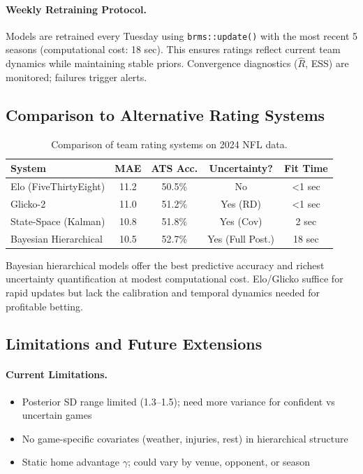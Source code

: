 \paragraph{Weekly Retraining Protocol.}
Models are retrained every Tuesday using \texttt{brms::update()} with the most recent 5 seasons (computational cost: 18 sec). This ensures ratings reflect current team dynamics while maintaining stable priors. Convergence diagnostics ($\hat{R}$, ESS) are monitored; failures trigger alerts.

\subsection{Comparison to Alternative Rating Systems}

\begin{table}[!ht]
\centering
\caption[Rating system comparison]{Comparison of team rating systems on 2024 NFL data.}
\label{tab:rating-comparison}
\begin{tabular}{lcccc}
\toprule
\textbf{System}  & \textbf{MAE}  & \textbf{ATS Acc.}  & \textbf{Uncertainty?}  & \textbf{Fit Time} \\
\midrule
Elo (FiveThirtyEight) & 11.2 & 50.5\% & No & <1 sec \\
Glicko-2 & 11.0 & 51.2\% & Yes (RD) & <1 sec \\
State-Space (Kalman) & 10.8 & 51.8\% & Yes (Cov) & 2 sec \\
Bayesian Hierarchical & 10.5 & 52.7\% & Yes (Full Post.) & 18 sec \\
\bottomrule
\end{tabular}
\end{table}

Bayesian hierarchical models offer the best predictive accuracy and richest uncertainty quantification at modest computational cost. Elo/Glicko suffice for rapid updates but lack the calibration and temporal dynamics needed for profitable betting.

\subsection{Limitations and Future Extensions}

\paragraph{Current Limitations.}
\begin{itemize}
  \item Posterior SD range limited (1.3--1.5); need more variance for confident vs uncertain games
  \item No game-specific covariates (weather, injuries, rest) in hierarchical structure
  \item Static home advantage $\gamma$; could vary by venue, opponent, or season
\end{itemize}

